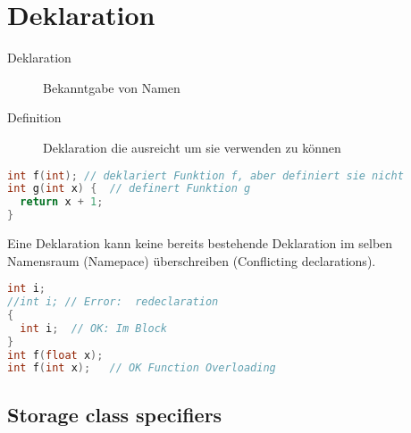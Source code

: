 \documentclass[10pt,twocolumn]{scrartcl}
\begin{document}
\section{Deklaration}

\begin{description}
  \item[Deklaration] Bekanntgabe von Namen
  \item[Definition] Deklaration die ausreicht um sie verwenden zu können
\end{description}

\begin{lstlisting}[language=C++]
int f(int); // deklariert Funktion f, aber definiert sie nicht
int g(int x) {  // definert Funktion g
  return x + 1;
}
\end{lstlisting}

Eine Deklaration kann keine bereits bestehende Deklaration im selben Namensraum
(Namepace) überschreiben (Conflicting declarations).

\begin{lstlisting}[language=C++]
int i;
//int i; // Error:  redeclaration
{
  int i;  // OK: Im Block
}
int f(float x);
int f(int x);   // OK Function Overloading
\end{lstlisting}

\subsection{Storage class specifiers}
\end{document}
